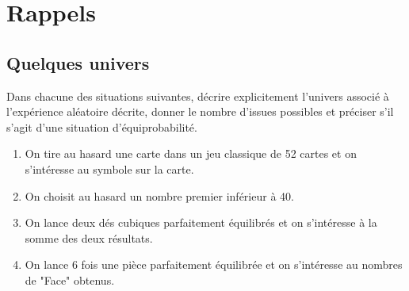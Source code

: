 \documentclass[oneside,12pt]{article}          %
\begin{document}
\section{Rappels}

\subsection{Quelques univers}
Dans chacune des situations suivantes, décrire explicitement l'univers associé à l'expérience aléatoire décrite, donner le nombre d'issues possibles et préciser s'il s'agit d'une situation d'équiprobabilité.
\begin{enumerate}
	\item On tire au hasard une carte dans un jeu classique de 52 cartes et on s'intéresse au symbole sur la carte.
	\item On choisit au hasard un nombre premier inférieur à 40.
	\item On lance deux dés cubiques parfaitement équilibrés et on s'intéresse à la somme des deux résultats.
	\item On lance 6 fois une pièce parfaitement équilibrée et on s'intéresse au nombres de "Face" obtenus.
\end{enumerate}
\end{document}
